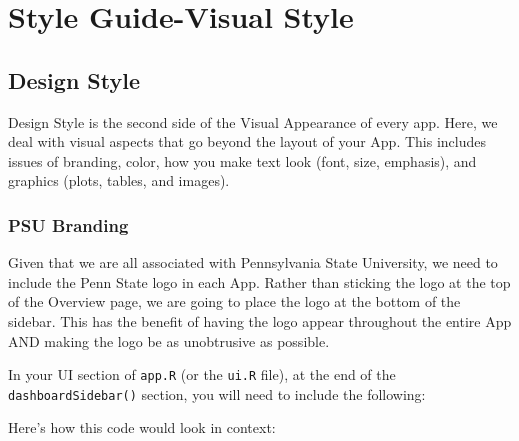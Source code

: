 \documentclass[
]{book}
\newenvironment{Shaded}{\begin{snugshade}}{\end{snugshade}}
\newcommand{\DataTypeTok}[1]{\textcolor[rgb]{0.13,0.29,0.53}{#1}}
\newcommand{\KeywordTok}[1]{\textcolor[rgb]{0.13,0.29,0.53}{\textbf{#1}}}
\newcommand{\NormalTok}[1]{#1}
\newcommand{\OperatorTok}[1]{\textcolor[rgb]{0.81,0.36,0.00}{\textbf{#1}}}
\newcommand{\StringTok}[1]{\textcolor[rgb]{0.31,0.60,0.02}{#1}}
\begin{document}
\hypertarget{part-style-guide-visual-style}{%
\part{Style Guide-Visual Style}\label{part-style-guide-visual-style}}

\hypertarget{designStyle}{%
\chapter{Design Style}\label{designStyle}}

Design Style is the second side of the Visual Appearance of every app. Here, we deal with visual aspects that go beyond the layout of your App. This includes issues of branding, color, how you make text look (font, size, emphasis), and graphics (plots, tables, and images).

\hypertarget{logo}{%
\section{PSU Branding}\label{logo}}

Given that we are all associated with Pennsylvania State University, we need to include the Penn State logo in each App. Rather than sticking the logo at the top of the Overview page, we are going to place the logo at the bottom of the sidebar. This has the benefit of having the logo appear throughout the entire App AND making the logo be as unobtrusive as possible.

In your UI section of \texttt{app.R} (or the \texttt{ui.R} file), at the end of the \texttt{dashboardSidebar()} section, you will need to include the following:

\begin{Shaded}
\end{Shaded}

Here's how this code would look in context:
\end{document}

